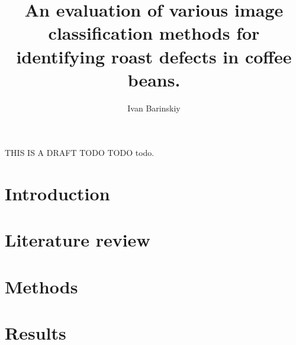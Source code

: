 \documentclass{./template/UoYCSproject}
\author{Ivan Barinskiy}
\title{An evaluation of various image classification methods for identifying
roast defects in coffee beans.}
\begin{document}
	\maketitle
	\listoffigures \listoftables

	\begin{summary}
		THIS IS A DRAFT TODO TODO todo.
	\end{summary}

	\chapter{Introduction}
	\label{ch:introduction}
	

	\chapter{Literature review}
	\label{ch:litreview}
	

	\chapter{Methods}
	\label{ch:methods}
	
	\chapter{Results}\label{ch:results}
    

	\printbibliography
\end{document}
